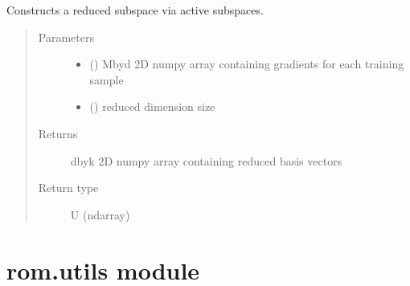 \documentclass[letterpaper,10pt,english]{sphinxmanual}
\begin{document}
\begin{fulllineitems}
\label{\detokenize{rom:rom.subspaces.POD}}
\sphinxAtStartPar
Constructs a reduced subspace via active subspaces.
\begin{quote}\begin{description}
\item[{Parameters}] \leavevmode\begin{itemize}
\item {} 
\sphinxAtStartPar
{} () \textendash{} M\sphinxhyphen{}by\sphinxhyphen{}d 2D numpy array containing gradients for each training sample

\item {} 
\sphinxAtStartPar
{} () \textendash{} reduced dimension size

\end{itemize}

\item[{Returns}] \leavevmode
\sphinxAtStartPar
d\sphinxhyphen{}by\sphinxhyphen{}k 2D numpy array containing reduced basis vectors

\item[{Return type}] \leavevmode
\sphinxAtStartPar
U (ndarray)

\end{description}\end{quote}

\end{fulllineitems}



\section{rom.utils module}
\label{\detokenize{rom:module-rom.utils}}\label{\detokenize{rom:rom-utils-module}}
\end{document}
